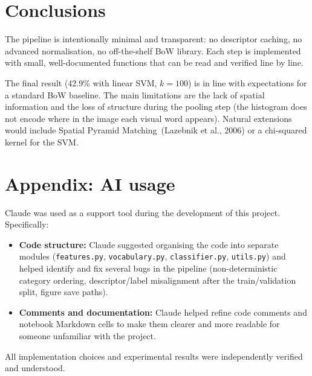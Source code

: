 \documentclass[11pt, a4paper]{article}
\begin{document}
\section{Conclusions}

The pipeline is intentionally minimal and transparent: no descriptor
caching, no advanced normalisation, no off-the-shelf BoW library. Each
step is implemented with small, well-documented functions that can be
read and verified line by line.

The final result (42.9\% with linear SVM, $k{=}100$) is in line with
expectations for a standard BoW baseline. The main limitations are the
lack of spatial information and the loss of structure during the
pooling step (the histogram does not encode where in the image each
visual word appears). Natural extensions would include Spatial Pyramid
Matching~(Lazebnik et al., 2006) or a chi-squared kernel for the SVM.

\appendix
\section*{Appendix: AI usage}

Claude was used as a support tool during the development of
this project. Specifically:
\begin{itemize}
    \item \textbf{Code structure:} Claude suggested organising the code
    into separate modules (\texttt{features.py}, \texttt{vocabulary.py},
    \texttt{classifier.py}, \texttt{utils.py}) and helped identify and
    fix several bugs in the pipeline (non-deterministic category
    ordering, descriptor/label misalignment after the train/validation
    split, figure save paths).
    \item \textbf{Comments and documentation:} Claude helped refine code
    comments and notebook Markdown cells to make them clearer and more
    readable for someone unfamiliar with the project.
\end{itemize}

All implementation choices and experimental results were independently
verified and understood.
\end{document}
